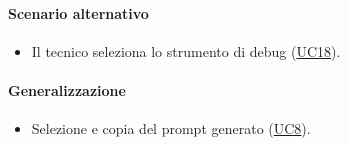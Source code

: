 \paragraph*{Scenario alternativo}
\begin{itemize}
  \item Il tecnico seleziona lo strumento di debug (\hyperref[UC18]{UC18}).
\end{itemize}

\paragraph*{Generalizzazione}
\begin{itemize}
    \item Selezione e copia del prompt generato (\hyperref[UC8]{UC8}).
\end{itemize}